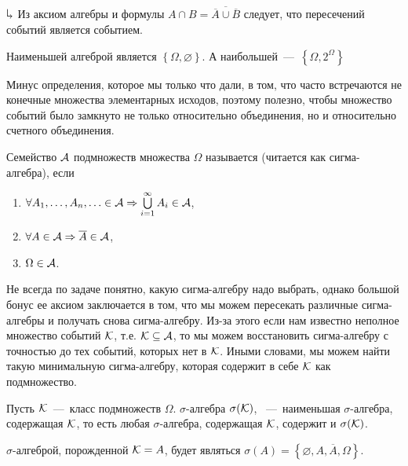 \documentclass[../TV&MS.tex]{subfiles}
\begin{document}
$\h$ Из аксиом алгебры и формулы $A\cap B = \overline{\overline{A} \cup \overline {B}}$ 
следует, что пересечений событий является событием.

\begin{Ex}
	Наименьшей алгеброй является $\left\{ \Omega, \varnothing \right\}$.
	А наибольшей~---~$\left\{ \Omega, 2^\Omega \right\}$
\end{Ex}

Минус определения, которое мы только что дали, в том, что часто встречаются не 
конечные множества элементарных исходов, поэтому полезно, чтобы множество
событий было замкнуто не только относительно объединения, но и 
относительно счетного объединения.

\begin{Def}
	Семейство $\mathcal{A}$ подмножеств множества $\Omega$ называется 
	(читается как сигма-алгебра), если 
\begin{enumerate}[label=(\roman*)]
	\item $\forall A_1,\dots,A_n,\ldots\in\mathcal{A}\Rightarrow\bigcup\limits_{i=1}^{\infty}A_i\in\mathcal{A}$,
	\item $\forall A \in \mathcal{A} \Rightarrow \overline{A} \in \mathcal{A}$,
	\item $\Omega \in \mathcal{A}$.
\end{enumerate}\smallskip
\end{Def}

Не всегда по задаче понятно, какую сигма-алгебру надо выбрать, однако большой
бонус ее аксиом заключается в том, что мы можем пересекать различные сигма-алгебры
и получать снова сигма-алгебру. Из-за этого если нам известно неполное множество
событий $\mathcal{K}$, т.е. $\mathcal{K}\subseteq\mathcal{A}$, то мы можем восстановить сигма-алгебру
с точностью до тех событий, которых нет в $\mathcal{K}$. Иными словами, мы можем
найти такую минимальную сигма-алгебру, которая содержит в себе $\mathcal{K}$ как подмножество.

\begin{Def}
	Пусть $\mathcal{K}$~---~класс подмножеств $\Omega$. $\sigma$-алгебра $\sigma(\mathcal{K})$,
	~---~наименьшая $\sigma$-алгебра, содержащая $\mathcal{K}$, 
	то есть любая $\sigma$-алгебра, содержащая $\mathcal{K}$, содержит и $\sigma(\mathcal{K})$.
\end{Def}

\begin{Ex}
	$\sigma$-алгеброй, порожденной $\mathcal{K} = A$, будет являться 
	$\sigma(A) = \left\{ \varnothing, A, \overline{A}, \Omega \right\}$.
\end{Ex}
\end{document}
